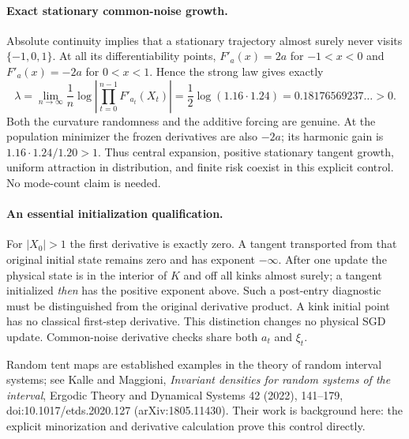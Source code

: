 \paragraph{Exact stationary common-noise growth.}
Absolute continuity implies that a stationary trajectory almost surely
never visits $\{-1,0,1\}$. At all its differentiability points,
$F'_a(x)=2a$ for $-1<x<0$ and $F'_a(x)=-2a$ for $0<x<1$.
Hence the strong law gives exactly
\[
\lambda=\lim_{n\to\infty}\frac1n
\log\left|\prod_{t=0}^{n-1}F'_{a_t}(X_t)\right|
=\frac12\log(1.16\cdot1.24)
=0.18176569237\ldots>0.
\]
Both the curvature randomness and the additive forcing are genuine.
At the population minimizer the frozen derivatives are also $-2a$;
its harmonic gain is $1.16\cdot1.24/1.20>1$. Thus central expansion,
positive stationary tangent growth, uniform attraction in distribution,
and finite risk coexist in this explicit control. No mode-count claim
is needed.

\paragraph{An essential initialization qualification.}
For $|X_0|>1$ the first derivative is exactly zero. A tangent transported
from that original initial state remains zero and has exponent $-\infty$.
After one update the physical state is in the interior of $K$ and off all
kinks almost surely; a tangent initialized \emph{then} has the positive
exponent above. Such a post-entry diagnostic must be distinguished from
the original derivative product. A kink initial point has no classical
first-step derivative. This distinction changes no physical SGD update.
Common-noise derivative checks share both $a_t$ and $\xi_t$.

Random tent maps are established examples in the theory of random
interval systems; see Kalle and Maggioni, \emph{Invariant densities for
random systems of the interval}, Ergodic Theory and Dynamical Systems
42 (2022), 141--179, doi:10.1017/etds.2020.127
(arXiv:1805.11430). Their work is background here: the explicit
minorization and derivative calculation prove this control directly.

